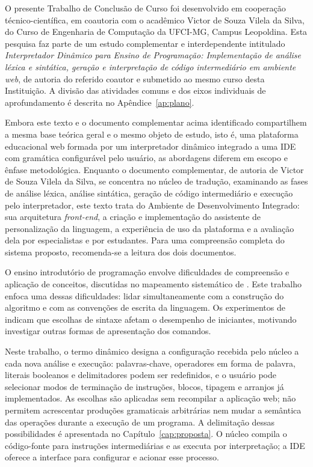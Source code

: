 \label{cap:introducao_modelo}

O presente Trabalho de Conclusão de Curso foi desenvolvido em cooperação técnico-científica, em coautoria com o acadêmico Victor de Souza Vilela da Silva, do Curso de Engenharia de Computação da UFCI-MG, Campus Leopoldina. Esta pesquisa faz parte de um estudo complementar e interdependente intitulado \textit{Interpretador Dinâmico para Ensino de Programação: Implementação de análise léxica e sintática, geração e interpretação de código intermediário em ambiente web}, de autoria do referido coautor e submetido ao mesmo curso desta Instituição. A divisão das atividades comuns e dos eixos individuais de aprofundamento é descrita no Apêndice~\ref{ap:plano}.

Embora este texto e o documento complementar acima identificado compartilhem a mesma base teórica geral e o mesmo objeto de estudo, isto é, uma plataforma educacional web formada por um interpretador dinâmico integrado a uma IDE com gramática configurável pelo usuário, as abordagens diferem em escopo e ênfase metodológica. Enquanto o documento complementar, de autoria de Victor de Souza Vilela da Silva, se concentra no núcleo de tradução, examinando as fases de análise léxica, análise sintática, geração de código intermediário e execução pelo interpretador, este texto trata do Ambiente de Desenvolvimento Integrado: sua arquitetura \textit{front-end}, a criação e implementação do assistente de personalização da linguagem, a experiência de uso da plataforma e a avaliação dela por especialistas e por estudantes. Para uma compreensão completa do sistema proposto, recomenda-se a leitura dos dois documentos.

O ensino introdutório de programação envolve dificuldades de compreensão e aplicação de conceitos, discutidas no mapeamento sistemático de . Este trabalho enfoca uma dessas dificuldades: lidar simultaneamente com a construção do algoritmo e com as convenções de escrita da linguagem. Os experimentos de  indicam que escolhas de sintaxe afetam o desempenho de iniciantes, motivando investigar outras formas de apresentação dos comandos.

Neste trabalho, o termo dinâmico designa a configuração recebida pelo núcleo a cada nova análise e execução: palavras-chave, operadores em forma de palavra, literais booleanos e delimitadores podem ser redefinidos, e o usuário pode selecionar modos de terminação de instruções, blocos, tipagem e arranjos já implementados. As escolhas são aplicadas sem recompilar a aplicação web; não permitem acrescentar produções gramaticais arbitrárias nem mudar a semântica das operações durante a execução de um programa. A delimitação dessas possibilidades é apresentada no Capítulo~\ref{cap:proposta}. O núcleo compila o código-fonte para instruções intermediárias e as executa por interpretação; a IDE oferece a interface para configurar e acionar esse processo.

